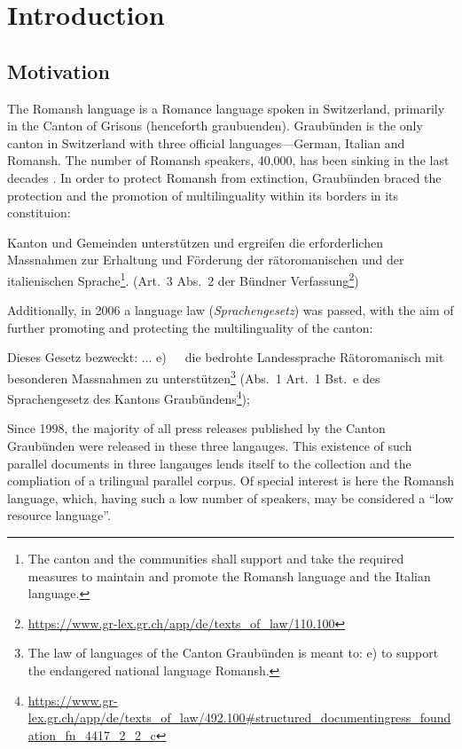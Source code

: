 \chapter{Introduction}
\section{Motivation}
The Romansh language is a Romance language spoken in Switzerland, primarily in the Canton of Grisons (henceforth \gls{graubuenden}). 
Graubünden is the only canton in Switzerland with three official languages---German, Italian and Romansh. 
The number of Romansh speakers, 40,000, has been sinking in the last decades \autocite{bundesamt2020}. 
In order to protect Romansh from extinction, Graubünden braced the protection and the promotion of multilinguality within its borders in its constituion:


\begin{displayquote}
Kanton und Gemeinden unterstützen und ergreifen die erforderlichen Massnahmen zur Erhaltung und Förderung der rätoromanischen und der italienischen Sprache\footnote{The canton and the communities shall support and take the required measures to maintain and promote the Romansh language and the Italian language.}. 
(Art.~3 Abs.~2 der Bündner Verfassung\footnote{\url{https://www.gr-lex.gr.ch/app/de/texts_of_law/110.100}}) 
\end{displayquote}

Additionally, in 2006 a language law (\emph{Sprachengesetz}) was passed, with the aim of further promoting and protecting the multilinguality of the canton:
\begin{displayquote}
Dieses Gesetz bezweckt:
...
e)~~~die  bedrohte  Landessprache  Rätoromanisch  mit  besonderen  Massnahmen zu unterstützen\footnote{The law of languages of the Canton Graubünden is meant to: e) to support the endangered national language Romansh.} (Abs.~1 Art.~1 Bst.~e des Sprachengesetz des Kantons Graubündens\footnote{\url{https://www.gr-lex.gr.ch/app/de/texts_of_law/492.100\#structured_documentingress_foundation_fn_4417_2_2_c}}); 
\end{displayquote}


Since 1998, the majority of all press releases published by the Canton Graubünden were released in these three langauges. 
This existence of such parallel documents in three langauges lends itself to the collection and the compliation of a trilingual parallel corpus. 
Of special interest is here the Romansh language, which, having such a low number of speakers, may be considered a  \enquote{low resource language}.


